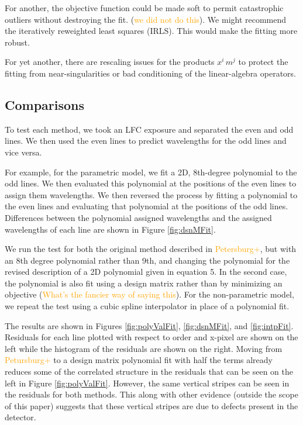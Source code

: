 \documentclass[12pt, letterpaper]{article}
\newcommand{\lz}[1]{\textcolor{orange}{#1}}
\begin{document}
For another, the objective function could be made soft to permit catastrophic outliers without destroying the fit. (\lz{we did not do this}).  We might recommend the iteratively reweighted least squares (IRLS).  This would make the fitting more robust.

For yet another, there are rescaling issues for the products $x^i\,m^j$ to protect the fitting from near-singularities or bad conditioning of the linear-algebra operators.

\subsection{Comparisons}
To test each method, we took an LFC exposure and separated the even and odd lines.  We then used the even lines to predict wavelengths for the odd lines and vice versa.

For example, for the parametric model, we fit a 2D, 8th-degree polynomial to the odd lines.  We then evaluated this polynomial at the positions of the even lines to assign them wavelengths.  We then reversed the process by fitting a polynomial to the even lines and evaluating that polynomial at the positions of the odd lines.  Differences between the polynomial assigned wavelengths and the assigned wavelengths of each line are shown in Figure \ref{fig:dsnMFit}.

We run the test for both the original method described in \lz{Petersburg+}, but with an 8th degree polynomial rather than 9th, and changing the polynomial for the revised description of a 2D polynomial given in equation 5.  In the second case, the polynomial is also fit using a design matrix rather than by minimizing an objective (\lz{What's the fancier way of saying this}).  For the non-parametric model, we repeat the test using a cubic spline interpolator in place of a polynomial fit.

The results are shown in Figures \ref{fig:polyValFit}, \ref{fig:dsnMFit}, and \ref{fig:intpFit}.  Residuals for each line plotted with respect to order and x-pixel are shown on the left while the histogram of the residuals are shown on the right.  Moving from \lz{Petursburg+} to a design matrix polynomial fit with half the terms already reduces some of the correlated structure in the residuals that can be seen on the left in Figure \ref{fig:polyValFit}.  However, the same vertical stripes can be seen in the residuals for both methods.  This along with other evidence (outside the scope of this paper) suggests that these vertical stripes are due to defects present in the detector.
\end{document}
